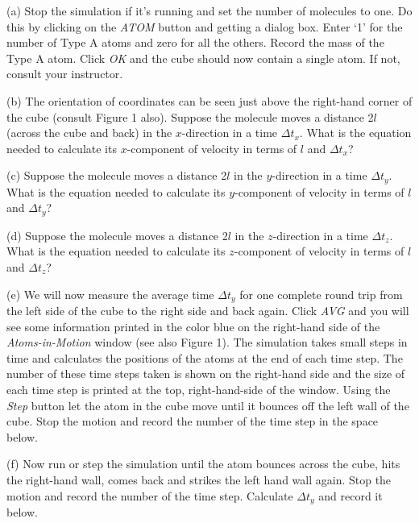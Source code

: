 (a) Stop the simulation if it's running and set the number of molecules to 
one. Do this by clicking on the {\it ATOM} button and getting a dialog box.
Enter `1' for the
number of Type A atoms and zero for all the others. Record the mass of the
Type A atom. Click {\it OK} and
the cube should now contain a single atom. If not, consult your instructor.
\vspace{20mm}

(b) The orientation of coordinates can be seen just above the right-hand corner
of the cube (consult Figure 1 also).
Suppose the molecule moves a distance 2$l$ (across the cube and back) in the $x$-direction in
a time \( \Delta t_{x} \). What is the equation needed to calculate
its $x$-component of velocity in terms of $l$ and \( \Delta t_{x} \)?
\vspace{20mm}

(c) Suppose the molecule moves a distance 2$l$ in the $y$-direction in
a time \( \Delta t_{y} \). What is the equation needed to calculate
its $y$-component of velocity in terms of $l$ and \( \Delta t_{y} \)?
\vspace{20mm}

(d) Suppose the molecule moves a distance 2$l$ in the $z$-direction in
a time \( \Delta t_{z} \). What is the equation needed to calculate
its $z$-component of velocity in terms of $l$ and \( \Delta t_{z} \)?
\vspace{20mm}

(e) We will now measure the average time $\Delta t_y$ for one complete round trip
from the left side of the cube to the right side and back again.
Click {\it AVG} and you will see some information printed in the color blue
on the right-hand side of the {\it Atoms-in-Motion} window (see also Figure 1).
The simulation takes small steps in time and calculates the positions of the
atoms at the end of each time step.
The number of these time steps taken is shown on the right-hand side and the size 
of each time step is printed at the top, right-hand-side of the window.
Using the {\it Step} button let the atom in the cube move until it bounces off the 
left wall of the cube. 
Stop the motion and record the number of the time step in the space below.
\vspace{20mm}

\newpage

(f) Now run or step the simulation until the atom bounces across the cube, 
hits the right-hand wall, comes back and strikes the left hand wall again. 
Stop the motion and record the number of the time step.
Calculate $\Delta t_y$ and record it below.
\vspace{20mm}

